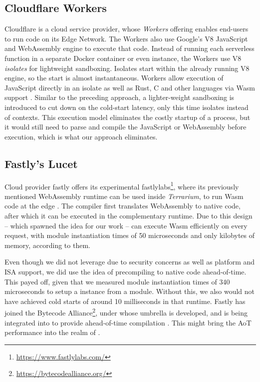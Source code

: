 \subsection{Cloudflare Workers}

Cloudflare is a cloud service provider, whose \emph{Workers} offering enables end-users to run code on its Edge Network. The Workers also use Google's V8 JavaScript and WebAssembly engine to execute that code.
Instead of running each serverless function in a separate Docker container or even  instance, the Workers use V8 \emph{isolates} for lightweight sandboxing. Isolates start within the already running V8 engine, so the start is almost instantaneous.
Workers allow execution of JavaScript directly in an isolate as well as Rust, C and other languages via Wasm support \cite{Cloudflare2021}.
Similar to the preceding approach, a lighter-weight sandboxing is introduced to cut down on the cold-start latency, only this time isolates instead of contexts. This execution model eliminates the costly startup of a  process, but it would still need to parse and compile the JavaScript or WebAssembly before execution, which is what our approach eliminates.


\subsection{Fastly's Lucet}

Cloud provider fastly offers its experimental fastlylabs\footnote{\url{https://www.fastlylabs.com/}}, where its previously mentioned  WebAssembly runtime can be used inside \emph{Terrarium}, to run Wasm code at the edge \cite{fastly2019}. The  compiler first translates WebAssembly to native code, after which it can be executed in the complementary runtime. Due to this design -- which spawned the idea for our work --  can execute Wasm efficiently on every request, with module instantiation times of 50 microseconds and only kilobytes of memory, according to them.

Even though we did not leverage  due to security concerns as well as platform and ISA support, we did use the idea of precompiling to native code ahead-of-time. This payed off, given that we measured module instantiation times of 340 microseconds to setup a  instance from a module. Without this, we also would not have achieved cold starts of around 10 milliseconds in that runtime.
Fastly has joined the Bytecode Alliance\footnote{\url{https://bytecodealliance.org/}}, under whose umbrella  is developed, and  is being integrated into  to provide ahead-of-time compilation \cite{Hickey2020}. This might bring the AoT performance into the realm of .

